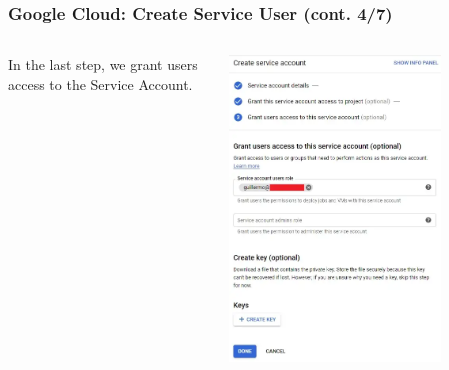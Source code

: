 \documentclass[aspectratio=169]{beamer}
\begin{document}
\begin{frame}
	\frametitle{Google Cloud: Create Service User (cont. 4/7)}
	\begin{columns}
		\begin{column}{0.5\textwidth}
			In the last step, we grant users access to the Service Account.
		\end{column}
		\begin{column}{0.5\textwidth}
			\begin{center}
				\includegraphics[width=0.75\textwidth]{../images/gcp-serv-acct4.png}
			\end{center}
		\end{column}
	\end{columns}
\end{frame}
\end{document}
